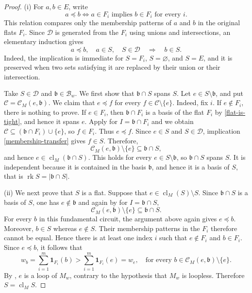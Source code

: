 \documentclass[10pt]{amsart}
\theoremstyle{plain}
\theoremstyle{definition}
\newcommand{\one}{\mathbf{1}}
\newcommand{\B}{\mathcal{B}}
\newcommand{\C}{\mathcal{C}}
\newcommand{\D}{\mathcal{D}}
\newcommand{\rk}{\operatorname{rk}}
\newcommand{\cl}{\operatorname{cl}}
\newcommand{\bb}{\mathfrak{b}}
\begin{document}
\begin{proof}
(i) For $a,b\in E$, write
\begin{equation}\label{membership-preorder}
a\preceq b \iff a\in F_i \text{ implies } b\in F_i \text{ for every }i.
\end{equation}
This relation compares only the membership patterns of $a$ and $b$ in the original flats $F_i$. Since $\D$ is generated from the $F_i$ using unions and intersections, an elementary induction gives
\begin{equation}\label{membership-transfer}
a\preceq b,\quad a\in S,\quad S\in\D\quad\Longrightarrow\quad b\in S.
\end{equation}
Indeed, the implication is immediate for $S=F_i$, $S=\varnothing$, and $S=E$, and it is preserved when two sets satisfying it are replaced by their union or their intersection.

Take $S\in\D$ and $\bb\in\B_w$. We first show that $\bb\cap S$ spans $S$. Let $e\in S\setminus\bb$, and put $\C=\C_M(e,\bb)$. We claim that $e\preceq f$ for every $f\in\C\setminus\{e\}$. Indeed, fix $i$. If $e\notin F_i$, there is nothing to prove. If $e\in F_i$, then $\bb\cap F_i$ is a basis of the flat $F_i$ by \eqref{flat-is-tight}, and hence it spans $e$. Apply  for $I=\bb\cap F_i$ and we obtain $\C\subseteq(\bb\cap F_i)\cup\{e\}$, so $f\in F_i$. Thus $e\preceq f$. Since $e\in S$ and $S\in\mathcal D$, implication \eqref{membership-transfer} gives $f\in S$. Therefore,
\[
\C_M(e,\bb)\setminus\{e\}\subseteq\bb\cap S,
\]
and hence $e\in\cl_M(\bb\cap S)$. This holds for every $e\in S\setminus\bb$, so $\bb\cap S$ spans $S$. It is independent because it is contained in the basis $\bb$, and hence it is a basis of $S$, that is $\rk S=|\bb\cap S|$.

(ii) We next prove that $S$ is a flat. Suppose that $e\in\cl_M(S)\setminus S$. Since $\bb\cap S$ is a basis of $S$, one has $e\notin\bb$ and again by  for $I=\bb\cap S$,
\[
\C_M(e,\bb)\setminus\{e\}\subseteq\bb\cap S.
\]
For every $b$ in this fundamental circuit, the argument above again gives $e\preceq b$. Moreover, $b\in S$ whereas $e\notin S$. Their membership patterns in the $F_i$ therefore cannot be equal. Hence there is at least one index $i$ such that $e\notin F_i$ and $b\in F_i$. Since $e\preceq b$, it follows that
\[
w_b=\sum_{i=1}^m\one_{F_i}(b)>\sum_{i=1}^m\one_{F_i}(e)=w_e, \quad \text{for every }b\in \C_M(e,\bb)\setminus\{e\}.
\]
By , $e$ is a loop of $M_w$, contrary to the hypothesis that $M_w$ is loopless. Therefore $S=\cl_MS$.


\end{proof}
\end{document}
